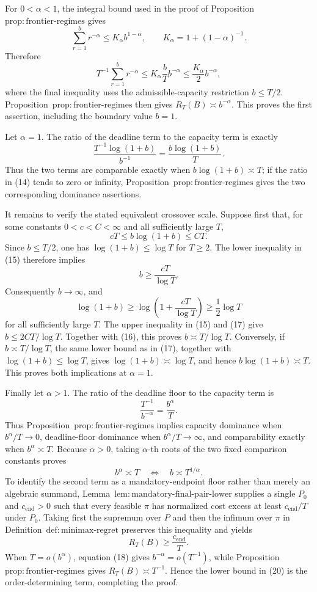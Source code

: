 For \(0<\alpha<1\), the integral bound used in the proof of Proposition~\(\mathrm{prop:frontier\text{-}regimes}\) gives
\[
\sum_{r=1}^{b}r^{-\alpha}
\le K_\alpha b^{1-\alpha},
\qquad
K_\alpha=1+(1-\alpha)^{-1}.
\]
Therefore
\[
T^{-1}\sum_{r=1}^{b}r^{-\alpha}
\le K_\alpha\frac bT b^{-\alpha}
\le \frac{K_\alpha}{2}b^{-\alpha}, \tag{13}
\]
where the final inequality uses the admissible-capacity restriction \(b\le T/2\).  Proposition~\(\mathrm{prop:frontier\text{-}regimes}\) then gives \(R_T(B)\asymp b^{-\alpha}\).  This proves the first assertion, including the boundary value \(b=1\).

Let \(\alpha=1\).  The ratio of the deadline term to the capacity term is exactly
\[
\frac{T^{-1}\log(1+b)}{b^{-1}}
=\frac{b\log(1+b)}{T}. \tag{14}
\]
Thus the two terms are comparable exactly when \(b\log(1+b)\asymp T\); if the ratio in (14) tends to zero or infinity, Proposition~\(\mathrm{prop:frontier\text{-}regimes}\) gives the two corresponding dominance assertions.

It remains to verify the stated equivalent crossover scale.  Suppose first that, for some constants \(0<c<C<\infty\) and all sufficiently large \(T\),
\[
cT\le b\log(1+b)\le CT. \tag{15}
\]
Since \(b\le T/2\), one has \(\log(1+b)\le\log T\) for \(T\ge2\).  The lower inequality in (15) therefore implies
\[
b\ge \frac{cT}{\log T}. \tag{16}
\]
Consequently \(b\to\infty\), and
\[
\log(1+b)
\ge \log\!\left(1+\frac{cT}{\log T}\right)
\ge \frac12\log T \tag{17}
\]
for all sufficiently large \(T\).  The upper inequality in (15) and (17) give \(b\le 2CT/\log T\).  Together with (16), this proves \(b\asymp T/\log T\).  Conversely, if \(b\asymp T/\log T\), the same lower bound as in (17), together with \(\log(1+b)\le\log T\), gives \(\log(1+b)\asymp\log T\), and hence \(b\log(1+b)\asymp T\).  This proves both implications at \(\alpha=1\).

Finally let \(\alpha>1\).  The ratio of the deadline floor to the capacity term is
\[
\frac{T^{-1}}{b^{-\alpha}}=\frac{b^\alpha}{T}. \tag{18}
\]
Thus Proposition~\(\mathrm{prop:frontier\text{-}regimes}\) implies capacity dominance when \(b^\alpha/T\to0\), deadline-floor dominance when \(b^\alpha/T\to\infty\), and comparability exactly when \(b^\alpha\asymp T\).  Because \(\alpha>0\), taking \(\alpha\)-th roots of the two fixed comparison constants proves
\[
b^\alpha\asymp T
\quad\Longleftrightarrow\quad
b\asymp T^{1/\alpha}. \tag{19}
\]
To identify the second term as a mandatory-endpoint floor rather than merely an algebraic summand, Lemma~\(\mathrm{lem:mandatory\text{-}final\text{-}pair\text{-}lower}\) supplies a single \(P_0\) and \(c_{\mathrm{end}}>0\) such that every feasible \(\pi\) has normalized cost excess at least \(c_{\mathrm{end}}/T\) under \(P_0\).  Taking first the supremum over \(P\) and then the infimum over \(\pi\) in Definition~\(\mathrm{def:minimax\text{-}regret}\) preserves this inequality and yields
\[
R_T(B)\ge \frac{c_{\mathrm{end}}}{T}. \tag{20}
\]
When \(T=o(b^\alpha)\), equation (18) gives \(b^{-\alpha}=o(T^{-1})\), while Proposition~\(\mathrm{prop:frontier\text{-}regimes}\) gives \(R_T(B)\asymp T^{-1}\).  Hence the lower bound in (20) is the order-determining term, completing the proof.
